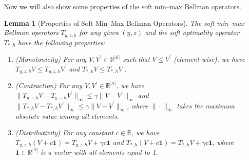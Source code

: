 \documentclass{article}
\theoremstyle{plain}
\newtheorem{lemma}{Lemma}
\theoremstyle{definition}
\theoremstyle{remark}
\begin{document}
Now we will also show some properties of the soft min--max Bellman operators.
\begin{lemma}[Properties of Soft Min--Max Bellman Operators]
    \label{lemma: reg-min-max-bellman-operator-properties}
    The soft min--max Bellman operators $T_{y,z,h}$ for any given $(y,z)$ and the soft optimality operator $T_{*,h}$ have the following properties:
    \begin{enumerate}[label=\roman*.]
        \item (Monotonicity) For any $V, V^\prime \in \mathbb{R}^{|\mathcal{S}|}$ such that $V \le V^\prime$ (element-wise), we have $T_{y,z,h} V \le T_{y,z,h} V^\prime$ and $T_{*,h} V \le T_{*,h} V^\prime$.
        \item (Contraction) For any $V, V^\prime \in \mathbb{R}^{|\mathcal{S}|}$, we have $\|T_{y,z,h} V - T_{y,z,h} V^\prime\|_\infty \le \gamma \| V - V^\prime \|_\infty$ and $\|T_{*,h} V - T_{*,h} V^\prime\|_\infty \le \gamma \| V - V^\prime \|_\infty$, where $\|\cdot\|_\infty$ takes the maximum absolute value among all elements.
        \item (Distributivity) For any constant $c \in \mathbb{R}$, we have $T_{y,z,h} (V + c \mathbf{1}) = T_{y,z,h} V + \gamma c \mathbf{1}$ and $T_{*,h} (V + c \mathbf{1}) = T_{*,h} V + \gamma c \mathbf{1}$, where $\mathbf{1} \in \mathbb{R}^{|\mathcal{S}|}$ is a vector with all elements equal to 1.
    \end{enumerate}
\end{lemma}
\end{document}
